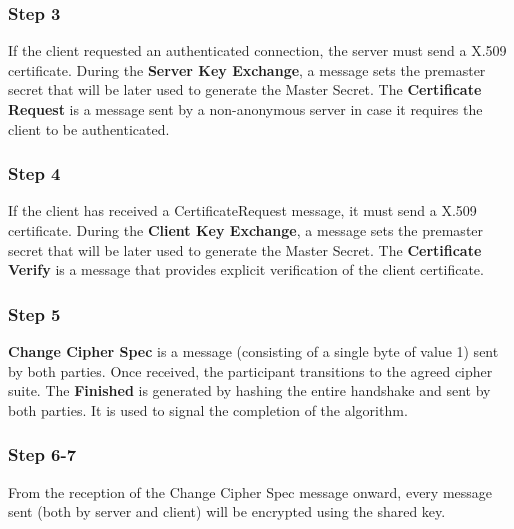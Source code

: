 \documentclass[a4paper, 10pt, titlepage]{article}
\begin{document}
\subsubsection*{Step 3}
If the client requested an authenticated connection, the server must
send a X.509 certificate. 
During the \textbf{Server Key Exchange}, a message sets the premaster secret that will be later used to generate the Master Secret. 
The \textbf{Certificate Request} is a message sent by a non-anonymous server in case it requires the client to be authenticated.
\subsubsection*{Step 4}
If the client has received a CertificateRequest message, it must send a X.509 certificate. 
During the \textbf{Client Key Exchange}, a message sets the premaster secret that will be later used to generate the Master Secret.
The \textbf{Certificate Verify} is a message that provides explicit verification of the client certificate.
\subsubsection*{Step 5}
\textbf{Change Cipher Spec} is a message (consisting of a single byte of value 1) sent by both parties. Once received, the participant transitions to the agreed cipher suite.
The \textbf{Finished} is generated by hashing the entire handshake and sent by both parties. It is used to signal the completion of the
algorithm.
\subsubsection*{Step 6-7}
From the reception of the Change Cipher Spec message onward, every message sent (both by server and client) will be encrypted using the shared key.
\end{document}
